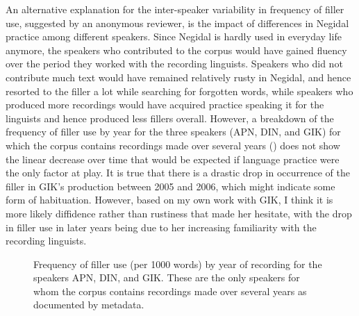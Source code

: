 \documentclass[output=paper]{langscibook}
\begin{document}
An alternative explanation for the inter-speaker variability in frequency of filler use, suggested by an anonymous reviewer, is the impact of differences in Negidal practice among different speakers. Since Negidal is hardly used in everyday life anymore, the speakers who contributed to the corpus would have gained fluency over the period they worked with the recording linguists. Speakers who did not contribute much text would have remained relatively rusty in Negidal, and hence resorted to the filler a lot while searching for forgotten words, while speakers who produced more recordings would have acquired practice speaking it for the linguists and hence produced less fillers overall. However, a breakdown of the frequency of filler use by year for the three speakers (APN, DIN, and GIK) for which the corpus contains recordings made over several years () does not show the linear decrease over time that would be expected if language practice were the only factor at play. It is true that there is a drastic drop in occurrence of the filler in GIK’s production between 2005 and 2006, which might indicate some form of habituation. However, based on my own work with GIK, I think it is more likely diffidence rather than rustiness that made her hesitate, with the drop in filler use in later years being due to her increasing familiarity with the recording linguists.   

\begin{figure}
\caption{Frequency of filler use (per 1000 words) by year of recording for the speakers APN, DIN, and GIK. These are the only speakers for whom the corpus contains recordings made over several years as documented by metadata.}
\label{fig:pakendorf:17}
\end{figure}
\end{document}
